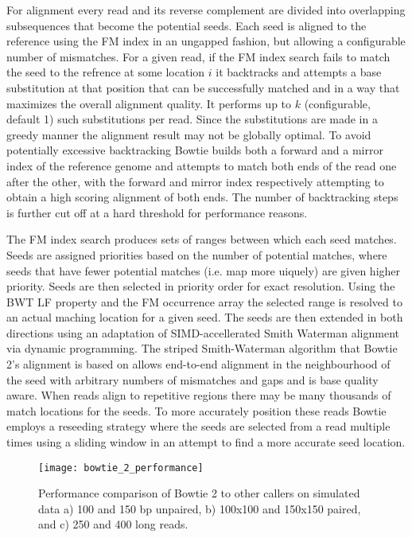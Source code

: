 For alignment every read and its reverse complement are divided into overlapping subsequences that become the potential seeds. Each seed is aligned to the reference using the FM index in an ungapped fashion, but allowing a configurable number of mismatches. For a given read, if the FM index search fails to match the seed to the refrence at some location $i$ it backtracks and attempts a base substitution at that position that can be successfully matched and in a way that maximizes the overall alignment quality. It performs up to $k$ (configurable, default 1) such substitutions per read. Since the substitutions are made in a greedy manner the alignment result may not be globally optimal. To avoid potentially excessive backtracking Bowtie builds both a forward and a mirror index of the reference genome and attempts to match both ends of the read one after the other, with the forward and mirror index respectively attempting to obtain a high scoring alignment of both ends. The number of backtracking steps is further cut off at a hard threshold for performance reasons.

The FM index search produces sets of ranges between which each seed matches. Seeds are assigned priorities based on the number of potential matches, where seeds that have fewer potential matches (i.e. map more uiquely) are given higher priority. Seeds are then selected in priority order for exact resolution. Using the BWT LF property and the FM occurrence array the selected range is resolved to an actual maching location for a given seed. The seeds are then extended in both directions using an adaptation of SIMD-accellerated Smith Waterman alignment via dynamic programming. The striped Smith-Waterman algorithm\autocite{farrar2006striped} that Bowtie 2's alignment is based on allows end-to-end alignment in the neighbourhood of the seed with arbitrary numbers of mismatches and gaps and is base quality aware. When reads align to repetitive regions there may be many thousands of match locations for the seeds. To more accurately position these reads Bowtie employs a reseeding strategy where the seeds are selected from a read multiple times using a sliding window in an attempt to find a more accurate seed location. 

\begin{figure}[H]
    \texttt{[image: bowtie\_2\_performance]}
    \centering
    \caption {Performance comparison of Bowtie 2 to other callers on simulated data a) 100 and 150 bp unpaired, b) 100x100 and 150x150 paired, and c) 250 and 400 long reads.\autocite{langmead2012fast}}
    \label{fig:bowtie_2_performance}
\end{figure}

